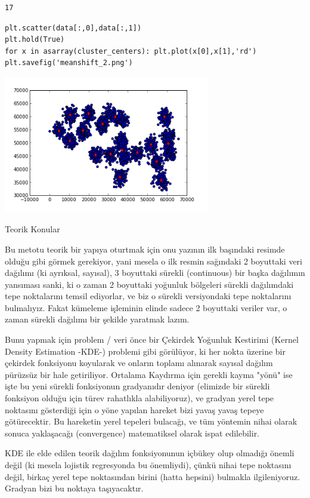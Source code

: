 \documentclass[12pt,fleqn]{article}\usepackage{../../common}
\begin{document}
\begin{verbatim}
17
\end{verbatim}

\begin{verbatim}
plt.scatter(data[:,0],data[:,1])
plt.hold(True)
for x in asarray(cluster_centers): plt.plot(x[0],x[1],'rd')
plt.savefig('meanshift_2.png')
\end{verbatim}

\includegraphics[height=6cm]{meanshift_2.png}

Teorik Konular

Bu metotu teorik bir yapıya oturtmak için onu yazının ilk başındaki
resimde olduğu gibi görmek gerekiyor, yani mesela o ilk resmin
sağındaki 2 boyuttaki veri dağılımı (ki ayrıksal, sayısal), 3
boyuttaki sürekli (continuous) bir başka dağılımın yansıması sanki, ki
o zaman 2 boyuttaki yoğunluk bölgeleri sürekli dağılımdaki tepe
noktalarını temsil ediyorlar, ve biz o sürekli versiyondaki tepe
noktalarını bulmalıyız. Fakat kümeleme işleminin elinde sadece 2
boyuttaki veriler var, o zaman sürekli dağılımı bir şekilde yaratmak
lazım.

Bunu yapmak için problem / veri önce bir Çekirdek Yoğunluk Kestirimi
(Kernel Density Estimation -KDE-) problemi gibi görülüyor, ki her
nokta üzerine bir çekirdek fonksiyonu koyularak ve onların toplamı
alınarak sayısal dağılım pürüzsüz bir hale getiriliyor. Ortalama
Kaydırma için gerekli kayma "yönü" ise işte bu yeni sürekli
fonksiyonun gradyanıdır deniyor (elimizde bir sürekli fonksiyon olduğu
için türev rahatlıkla alabiliyoruz), ve gradyan yerel tepe noktasını
gösterdiği için o yöne yapılan hareket bizi yavaş yavaş tepeye
götürecektir. Bu hareketin yerel tepeleri bulacağı, ve tüm yöntemin
nihai olarak sonuca yaklaşacağı (convergence) matematiksel olarak
ispat edilebilir.

KDE ile elde edilen teorik dağılım fonksiyonunun içbükey olup olmadığı
önemli değil (ki mesela lojistik regresyonda bu önemliydi), çünkü
nihai tepe noktasını değil, birkaç yerel tepe noktasından birini
(hatta hepsini) bulmakla ilgileniyoruz. Gradyan bizi bu noktaya
taşıyacaktır.
\end{document}
